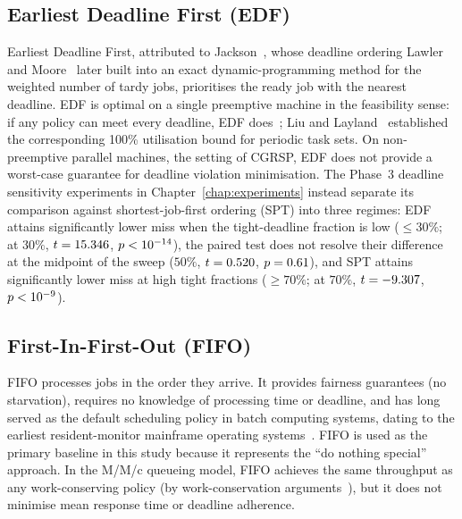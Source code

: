 \subsection{Earliest Deadline First (EDF)}
\label{ssec:earliest-deadline-first-edf}

Earliest Deadline First, attributed to Jackson~\cite{jackson1955scheduling}, whose deadline ordering Lawler and Moore~\cite{lawler1969functional} later built into an exact dynamic-programming method for the weighted number of tardy jobs, prioritises the ready job with the nearest deadline. EDF is optimal on a single preemptive machine in the feasibility sense: if any policy can meet every deadline, EDF does~\cite{dertouzos1974control}; Liu and Layland~\cite{liu1973scheduling} established the corresponding 100\% utilisation bound for periodic task sets. On non-preemptive parallel machines, the setting of CGRSP, EDF does not provide a worst-case guarantee for deadline violation minimisation. The Phase~3 deadline sensitivity experiments in Chapter~\ref{chap:experiments} instead separate its comparison against shortest-job-first ordering (SPT) into three regimes: EDF attains significantly lower miss when the tight-deadline fraction is low ($\leq 30\%$; at $30\%$, $t=15.346$, $p<10^{-14}$), the paired test does not resolve their difference at the midpoint of the sweep ($50\%$, $t=0.520$, $p=0.61$), and SPT attains significantly lower miss at high tight fractions ($\geq 70\%$; at $70\%$, $t=-9.307$, $p<10^{-9}$).

\subsection{First-In-First-Out (FIFO)}
\label{ssec:first-in-first-out-fifo}

FIFO processes jobs in the order they arrive. It provides fairness guarantees (no starvation), requires no knowledge of processing time or deadline, and has long served as the default scheduling policy in batch computing systems, dating to the earliest resident-monitor mainframe operating systems~\cite{silberschatz2018operating}. FIFO is used as the primary baseline in this study because it represents the ``do nothing special'' approach. In the M/M/c queueing model, FIFO achieves the same throughput as any work-conserving policy (by work-conservation arguments~\cite{pinedo2016scheduling}), but it does not minimise mean response time or deadline adherence.

